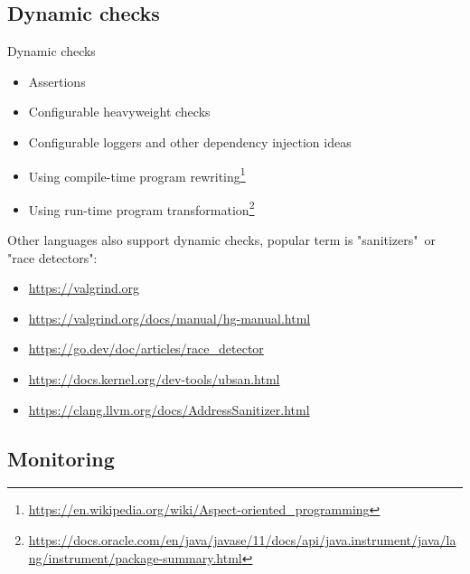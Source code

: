 \subsection{Dynamic checks}

\begin{frame}{Dynamic checks}

\begin{itemize}
  \item Assertions
  \item Configurable heavyweight checks
  \item Configurable loggers and other dependency injection ideas
  \item Using compile-time program rewriting\footnote{\tiny\url{https://en.wikipedia.org/wiki/Aspect-oriented_programming}}
  \item Using run-time program transformation\footnote{\tiny\url{https://docs.oracle.com/en/java/javase/11/docs/api/java.instrument/java/lang/instrument/package-summary.html}}
\end{itemize}

\pause
Other languages also support dynamic checks, popular term is "sanitizers"\ or "race detectors":
\begin{itemize}
  \item \url{https://valgrind.org}
  \item \url{https://valgrind.org/docs/manual/hg-manual.html}
  \item \url{https://go.dev/doc/articles/race_detector}
  \item \url{https://docs.kernel.org/dev-tools/ubsan.html}
  \item \url{https://clang.llvm.org/docs/AddressSanitizer.html}
\end{itemize}
\end{frame}


\subsection{Monitoring}

